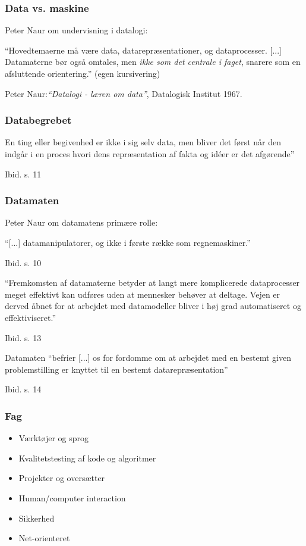 \documentclass{beamer}
\begin{document}
\begin{frame}
\frametitle{Data vs. maskine}
Peter Naur om undervisning i datalogi:

``Hovedtemaerne må være data, 
datarepræsentationer, og dataprocesser. [...] Datamaterne bør også omtales, men
\emph{ikke som det centrale i faget}, snarere som en afsluttende orientering.''
(egen kursivering)

Peter Naur:\emph{``Datalogi - læren om data''}, Datalogisk Institut 1967.
\end{frame}

\begin{frame}
\frametitle{Databegrebet}
En ting eller begivenhed er ikke i sig selv data, men bliver det først når den
indgår i en proces hvori dens repræsentation af fakta og idéer er det afgørende''

Ibid. s. 11
\end{frame}

\begin{frame}
\frametitle{Datamaten}
Peter Naur om datamatens primære rolle: 

``[...] datamanipulatorer, og ikke i første række som regnemaskiner.''

Ibid. s. 10 \newline

``Fremkomsten af datamaterne betyder at langt mere komplicerede dataprocesser 
meget effektivt kan udføres uden at mennesker behøver at deltage. Vejen er 
derved åbnet for at arbejdet med datamodeller bliver i høj grad automatiseret og 
effektiviseret.''

Ibid. s. 13 \newline

Datamaten ``befrier [...] os for fordomme om at arbejdet med en bestemt given
problemstilling er knyttet til en bestemt datarepræsentation''

Ibid. s. 14
\end{frame}
  
\begin{frame}
\frametitle{Fag}
\begin{itemize}
    \item{Værktøjer og sprog}
    \item{Kvalitetstesting af kode og algoritmer}
    \item{Projekter og oversætter}
    \item{Human/computer interaction}
    \item{Sikkerhed}
    \item{Net-orienteret}
\end{itemize}
\end{frame}
\end{document}
